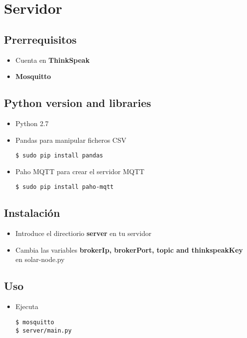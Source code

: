 \section{Servidor}
\label{makereference5.2}
\subsection{Prerrequisitos}
\label{makereference5.2.1}
	\begin{itemize}
		\item Cuenta en \textbf{ThinkSpeak}
		\item \textbf{Mosquitto}
	\end{itemize}
\subsection{Python version and libraries}
\label{makereference5.2.2}
	\begin{itemize}
		\item Python 2.7
		\item Pandas para manipular ficheros CSV
\begin{lstlisting}[frame=single]
$ sudo pip install pandas
\end{lstlisting}
		\item Paho MQTT para crear el servidor MQTT
\begin{lstlisting}[frame=single]
$ sudo pip install paho-mqtt
\end{lstlisting}

	\end{itemize}
\subsection{Instalación}
\label{makereference5.2.3}
\begin{itemize}
	\item Introduce el directiorio \textbf{server} en tu servidor
	\item Cambia las variables \textbf{brokerIp, brokerPort, topic and thinkspeakKey} en solar-node.py
\end{itemize}
\subsection{Uso}
\label{makereference5.2.4}
\begin{itemize}
	\item Ejecuta
\begin{lstlisting}[frame=single]
$ mosquitto
$ server/main.py
\end{lstlisting}
\end{itemize}
